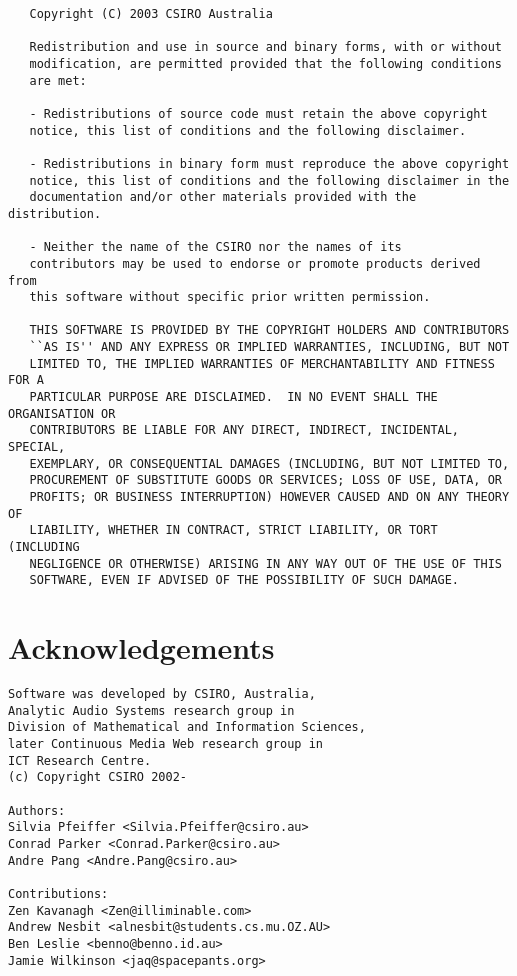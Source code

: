\footnotesize\begin{verbatim}   Copyright (C) 2003 CSIRO Australia

   Redistribution and use in source and binary forms, with or without
   modification, are permitted provided that the following conditions
   are met:
   
   - Redistributions of source code must retain the above copyright
   notice, this list of conditions and the following disclaimer.
   
   - Redistributions in binary form must reproduce the above copyright
   notice, this list of conditions and the following disclaimer in the
   documentation and/or other materials provided with the distribution.
   
   - Neither the name of the CSIRO nor the names of its
   contributors may be used to endorse or promote products derived from
   this software without specific prior written permission.
   
   THIS SOFTWARE IS PROVIDED BY THE COPYRIGHT HOLDERS AND CONTRIBUTORS
   ``AS IS'' AND ANY EXPRESS OR IMPLIED WARRANTIES, INCLUDING, BUT NOT
   LIMITED TO, THE IMPLIED WARRANTIES OF MERCHANTABILITY AND FITNESS FOR A
   PARTICULAR PURPOSE ARE DISCLAIMED.  IN NO EVENT SHALL THE ORGANISATION OR
   CONTRIBUTORS BE LIABLE FOR ANY DIRECT, INDIRECT, INCIDENTAL, SPECIAL,
   EXEMPLARY, OR CONSEQUENTIAL DAMAGES (INCLUDING, BUT NOT LIMITED TO,
   PROCUREMENT OF SUBSTITUTE GOODS OR SERVICES; LOSS OF USE, DATA, OR
   PROFITS; OR BUSINESS INTERRUPTION) HOWEVER CAUSED AND ON ANY THEORY OF
   LIABILITY, WHETHER IN CONTRACT, STRICT LIABILITY, OR TORT (INCLUDING
   NEGLIGENCE OR OTHERWISE) ARISING IN ANY WAY OUT OF THE USE OF THIS
   SOFTWARE, EVEN IF ADVISED OF THE POSSIBILITY OF SUCH DAMAGE.

\end{verbatim}
\normalsize
\section{Acknowledgements}\label{ack}


\footnotesize\begin{verbatim}Software was developed by CSIRO, Australia,
Analytic Audio Systems research group in
Division of Mathematical and Information Sciences,
later Continuous Media Web research group in
ICT Research Centre.
(c) Copyright CSIRO 2002-

Authors:
Silvia Pfeiffer <Silvia.Pfeiffer@csiro.au>
Conrad Parker <Conrad.Parker@csiro.au>
Andre Pang <Andre.Pang@csiro.au>

Contributions:
Zen Kavanagh <Zen@illiminable.com>
Andrew Nesbit <alnesbit@students.cs.mu.OZ.AU>
Ben Leslie <benno@benno.id.au>
Jamie Wilkinson <jaq@spacepants.org>
\end{verbatim}
\normalsize
 
